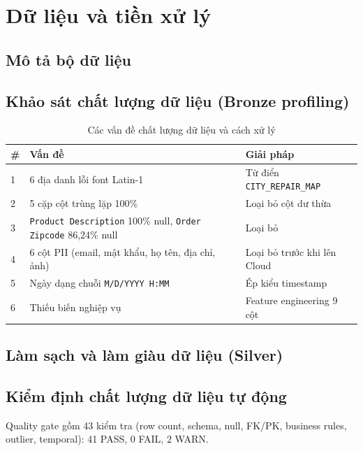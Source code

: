 \chapter{Dữ liệu và tiền xử lý}
\label{chap:data}

\section{Mô tả bộ dữ liệu}

\section{Khảo sát chất lượng dữ liệu (Bronze profiling)}
\begin{table}[H]
\centering
\caption{Các vấn đề chất lượng dữ liệu và cách xử lý}
\label{tab:dq-issues}
\begin{tabularx}{\linewidth}{lXX}
\toprule
\textbf{\#} & \textbf{Vấn đề} & \textbf{Giải pháp} \\ \midrule
1 & 6 địa danh lỗi font Latin-1 & Từ điển \texttt{CITY\_REPAIR\_MAP} \\
2 & 5 cặp cột trùng lặp 100\% & Loại bỏ cột dư thừa \\
3 & \texttt{Product Description} 100\% null, \texttt{Order Zipcode} 86,24\% null & Loại bỏ \\
4 & 6 cột PII (email, mật khẩu, họ tên, địa chỉ, ảnh) & Loại bỏ trước khi lên Cloud \\
5 & Ngày dạng chuỗi \texttt{M/D/YYYY H:MM} & Ép kiểu timestamp \\
6 & Thiếu biến nghiệp vụ & Feature engineering 9 cột \\
\bottomrule
\end{tabularx}
\end{table}

\section{Làm sạch và làm giàu dữ liệu (Silver)}

\section{Kiểm định chất lượng dữ liệu tự động}
Quality gate gồm 43 kiểm tra (row count, schema, null, FK/PK, business rules, outlier, temporal):
41 PASS, 0 FAIL, 2 WARN.
